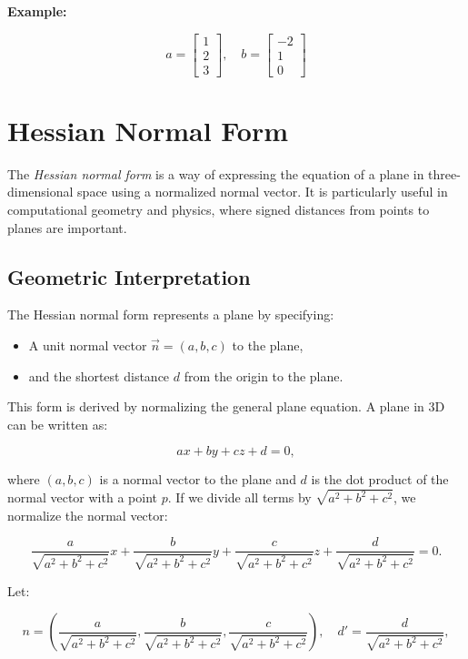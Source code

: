 \textbf{Example:}

\[
	a = \begin{bmatrix} 1 \\ 2 \\ 3 \end{bmatrix}, \quad b = \begin{bmatrix} -2 \\ 1 \\ 0 \end{bmatrix}
\]

\section{Hessian Normal Form}

The \emph{Hessian normal form} is a way of expressing the equation of a plane in three-dimensional space using a normalized normal vector. 
It is particularly useful in computational geometry and physics, where signed distances from points to planes are important.

\subsection{Geometric Interpretation}

The Hessian normal form represents a plane by specifying:

\begin{itemize}
	
	\item A unit normal vector \(\vec{n} = (a, b, c)\) to the plane,

	\item and the shortest distance \(d\) from the origin to the plane.

\end{itemize}

This form is derived by normalizing the general plane equation. A plane in 3D can be written as:

\[
	ax + by + cz + d = 0,
\]

where \((a, b, c)\) is a normal vector to the plane and \(d\) is the dot product of the normal vector with a point \(p\).
If we divide all terms by \(\sqrt{a^2 + b^2 + c^2}\), we normalize the normal vector:

\[
	\frac{a}{\sqrt{a^2 + b^2 + c^2}}x + \frac{b}{\sqrt{a^2 + b^2 + c^2}}y + \frac{c}{\sqrt{a^2 + b^2 + c^2}}z + \frac{d}{\sqrt{a^2 + b^2 + c^2}} = 0.
\]

Let:

\[
	n = \left(\frac{a}{\sqrt{a^2 + b^2 + c^2}}, \frac{b}{\sqrt{a^2 + b^2 + c^2}}, \frac{c}{\sqrt{a^2 + b^2 + c^2}}\right), \quad d' = \frac{d}{\sqrt{a^2 + b^2 + c^2}},
\]

